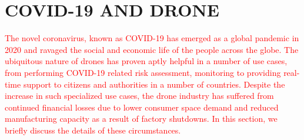 \section{COVID-19 AND DRONE}
\label{covid19section}
\textcolor{red}{
The novel coronavirus, known as COVID-19 has emerged as a global pandemic in 2020 and ravaged the social and economic life of the people across the globe. The ubiquitous nature of drones has proven aptly helpful in a number of use cases, from performing COVID-19 related risk assessment, monitoring to providing real-time support to citizens and authorities in a number of countries. Despite the increase in such specialized use cases, the drone industry has suffered from continued financial losses due to lower consumer space demand and reduced manufacturing capacity as a result of factory shutdowns. In this section, we briefly discuss the details of these circumstances.}

